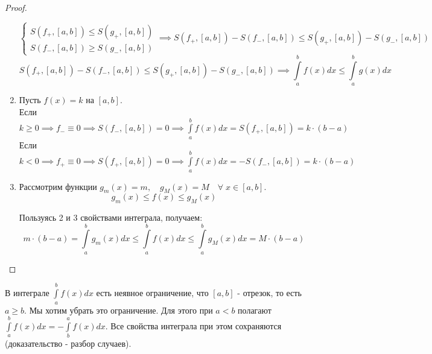 \documentclass[../main.tex]{subfiles}
\begin{document}
\begin{proof}
\begin{enumerate}
\begin{equation*}
        \end{equation*}
        \begin{equation*}
            \begin{cases}
                S\left( f_+, \left[ a,b\right]\right) \leq S\left( g_+, \left[ a,b\right]\right)\\
                S\left( f_-, \left[ a,b\right]\right) \geq S\left( g_-, \left[ a,b\right]\right)
            \end{cases}
            \implies
            S\left( f_+,\left[ a,b\right]\right)-S\left( f_-,\left[ a,b\right]\right) \leq S\left( g_+, \left[ a,b\right]\right)-S\left( g_-,\left[ a,b\right]\right)
        \end{equation*}
        \[S\left( f_+,\left[ a,b\right]\right)-S\left( f_-,\left[ a,b\right]\right) \leq S\left( g_+, \left[ a,b\right]\right)-S\left( g_-,\left[ a,b\right]\right) \implies \displaystyle\int\limits_{ a}^{ b} f\left( x\right)dx \leq \displaystyle\int\limits_{ a}^{ b} g \left( x\right)dx\]
        \item Пусть \( f\left( x\right)=k\) на \( \left[ a,b\right]\). \\
        Если \( k \geq 0 \implies f_-\equiv 0 \implies S\left( f_-,\left[ a,b\right]\right)=0 \implies \displaystyle\int\limits_{ a}^{ b} f\left( x\right)dx=S\left( f_+,\left[ a,b\right]\right)=k \cdot \left( b-a\right)\)\\
        Если \( k < 0 \implies f_+\equiv 0 \implies S\left( f_+,\left[ a,b\right]\right)=0 \implies \displaystyle\int\limits_{ a}^{ b} f\left( x\right)dx=-S\left( f_-,\left[ a,b\right]\right)=k \cdot \left( b-a\right)\)
        \item Рассмотрим функции \( g_m\left( x\right)=m,\quad g_M\left( x\right)=M\quad \forall \; x \in [a,b]\).
        \[ g_m\left( x\right) \leq f\left( x\right) \leq g_M\left( x\right)\]
        \par Пользуясь 2 и 3 свойствами интеграла, получаем:
        \[ m \cdot \left( b-a\right) = \displaystyle\int\limits_{ a}^{ b} g_m\left( x\right)dx \leq \displaystyle\int\limits_{ a}^{ b} f\left( x\right)dx \leq \displaystyle\int\limits_{ a}^{ b} g_M\left( x\right)dx=M \cdot \left( b-a\right)\]
    \end{enumerate}
\end{proof}

В интеграле \( \displaystyle\int\limits_{ a}^{ b} f\left( x\right)dx\) есть неявное ограничение, что \( \left[ a,b\right]\) - отрезок, то есть \( a \geq b\). Мы хотим убрать это ограничение. 
Для этого при \( a < b\) полагают \( \displaystyle\int\limits_{ a}^{ b} f\left( x\right)dx = - \displaystyle\int\limits_{ b}^{ a} f\left( x\right)dx\). Все свойства интеграла при этом сохраняются (доказательство - разбор случаев).
\end{document}
